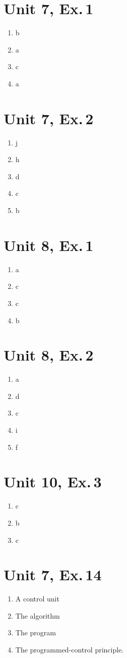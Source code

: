 \documentclass[a4paper,10pt,notitlepage,pdftex,headsepline]{scrartcl}
\begin{document}
\section{Unit 7, Ex.\,1}
\begin{enumerate}
\item b
\item a
\item c
\item a
\end{enumerate}
\section{Unit 7, Ex.\,2}
\begin{enumerate}
\item j
\item h
\item d
\item c
\item b
\end{enumerate}
\section{Unit 8, Ex.\,1}
\begin{enumerate}
\item a
\item c
\item c
\item b
\end{enumerate}
\section{Unit 8, Ex.\,2}
\begin{enumerate}
\item a
\item d
\item c
\item i
\item f
\end{enumerate}
\section{Unit 10, Ex.\,3}
\begin{enumerate}
\item c
\item b
\item c
\end{enumerate}
\section{Unit 7, Ex.\,14}
\begin{enumerate}
\item A control unit
\item The algorithm
\item The program
\item The programmed-control principle.
\end{enumerate}
\end{document}
